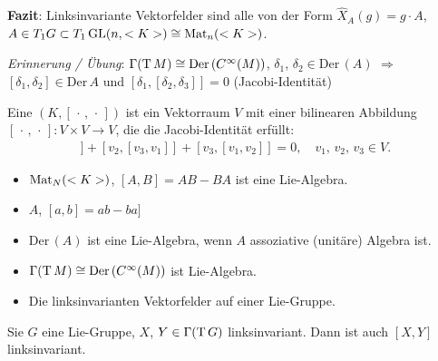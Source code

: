 \textbf{Fazit}: Linksinvariante Vektorfelder sind alle von der Form $\hat X_A(g) = g\cdot A$, $A\in T_1 G\subset T_1 \operatorname{GL}(n,<K>)\cong \operatorname{Mat}_n(<K>)$.

\emph{Erinnerung / Übung}: $\Gamma(\operatorname{T} M) \cong \mathrm{Der}\,(C^\infty(M))$, $\delta_1$, $\delta_2\in\mathrm{Der}\,(A)$ $\Rightarrow$ $[\delta_1,\delta_2]\in\mathrm{Der}\, A$ und $[\delta_1,[\delta_2,\delta_3]]=0$ (Jacobi-Identität)

\begin{definition}
	Eine  $(K,[\,\cdot\,,\,\cdot\,])$ ist ein Vektorraum $V$ mit einer bilinearen Abbildung $[\,\cdot\,,\,\cdot\,]\colon V\times V\to V$, die die Jacobi-Identität erfüllt: \begin{align*}
		[v_1,[v_2,v_3]] + [v_2,[v_3,v_1]] + [v_3,[v_1,v_2]] = 0,\quad v_1,\,v_2,\,v_3\in V.
	\end{align*}
\end{definition}

\begin{example}
	\begin{itemize}
		\item $\operatorname{Mat}_N(<K>)$, $[A,B] = AB - BA$ ist eine Lie-Algebra.
		\item $A$, $[a,b] = ab-ba]$
		\item $\mathrm{Der}\,(A)$ ist eine Lie-Algebra, wenn $A$ assoziative (unitäre) Algebra ist.
		\item $\Gamma(\operatorname{T} M)\cong \mathrm{Der}\,(C^\infty(M))$ ist Lie-Algebra.
		\item Die linksinvarianten Vektorfelder auf einer Lie-Gruppe.
	\end{itemize}
\end{example}

\begin{lemma}
	Sie $G$ eine Lie-Gruppe, $X$, $Y\in\Gamma(\operatorname{T} G)$ linksinvariant. Dann ist auch $[X,Y]$ linksinvariant.
\end{lemma}

